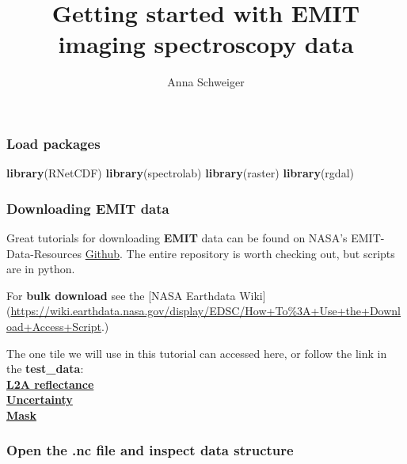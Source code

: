 \documentclass[
]{article}
\title{Getting started with EMIT imaging spectroscopy data}
\author{Anna Schweiger}
\date{}
\newenvironment{Shaded}{\begin{snugshade}}{\end{snugshade}}
\newcommand{\FunctionTok}[1]{\textcolor[rgb]{0.13,0.29,0.53}{\textbf{#1}}}
\newcommand{\NormalTok}[1]{#1}
\begin{document}
\maketitle

\hypertarget{load-packages}{%
\subsubsection{Load packages}\label{load-packages}}

\begin{Shaded}
\begin{Highlighting}[]
\FunctionTok{library}\NormalTok{(RNetCDF)}
\FunctionTok{library}\NormalTok{(spectrolab)}
\FunctionTok{library}\NormalTok{(raster)}
\FunctionTok{library}\NormalTok{(rgdal)}
\end{Highlighting}
\end{Shaded}

\hypertarget{downloading-emit-data}{%
\subsubsection{Downloading EMIT data}\label{downloading-emit-data}}

Great tutorials for downloading \textbf{EMIT} data can be found on
NASA's EMIT-Data-Resources
\href{https://github.com/nasa/EMIT-Data-Resources}{Github}. The entire
repository is worth checking out, but scripts are in python.

For \textbf{bulk download} see the {[}NASA Earthdata Wiki{]}
(\url{https://wiki.earthdata.nasa.gov/display/EDSC/How+To\%3A+Use+the+Download+Access+Script}.)

The one tile we will use in this tutorial can accessed here, or follow
the link in the \textbf{test\_data}:\\
\href{https://data.lpdaac.earthdatacloud.nasa.gov/lp-prod-protected/EMITL2ARFL.001/EMIT_L2A_RFL_001_20230812T223333_2322415_006/EMIT_L2A_RFL_001_20230812T223333_2322415_006.nc}{\textbf{L2A
reflectance}}\\
\href{https://data.lpdaac.earthdatacloud.nasa.gov/lp-prod-protected/EMITL2ARFL.001/EMIT_L2A_RFL_001_20230812T223333_2322415_006/EMIT_L2A_RFLUNCERT_001_20230812T223333_2322415_006.nc}{\textbf{Uncertainty}}\\
\href{https://data.lpdaac.earthdatacloud.nasa.gov/lp-prod-protected/EMITL2ARFL.001/EMIT_L2A_RFL_001_20230812T223333_2322415_006/EMIT_L2A_MASK_001_20230812T223333_2322415_006.nc}{\textbf{Μask}}

\hypertarget{open-the-.nc-file-and-inspect-data-structure}{%
\subsubsection{Open the .nc file and inspect data
structure}\label{open-the-.nc-file-and-inspect-data-structure}}
\end{document}
